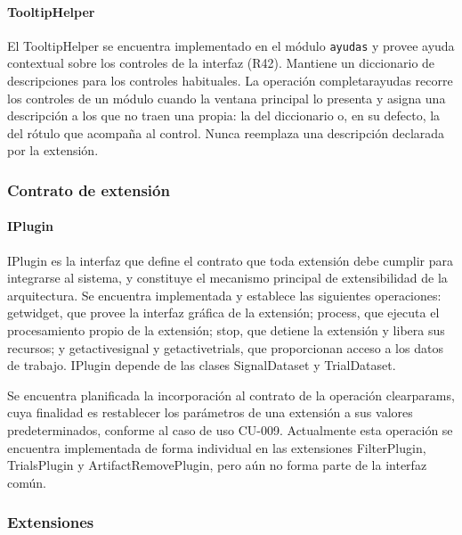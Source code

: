 \documentclass[11pt,a4paper]{article}
\DeclareRobustCommand{\_}{\textunderscore\allowbreak}
\begin{document}
\paragraph{TooltipHelper}
El TooltipHelper se encuentra implementado en el módulo \texttt{ayudas} y provee ayuda contextual sobre los controles de la interfaz (R42). Mantiene un diccionario de descripciones para los controles habituales. La operación completar\_ayudas recorre los controles de un módulo cuando la ventana principal lo presenta y asigna una descripción a los que no traen una propia: la del diccionario o, en su defecto, la del rótulo que acompaña al control. Nunca reemplaza una descripción declarada por la extensión.

\subsubsection{Contrato de extensión}

\paragraph{IPlugin}
IPlugin es la interfaz que define el contrato que toda extensión debe cumplir para integrarse al sistema, y constituye el mecanismo principal de extensibilidad de la arquitectura. Se encuentra implementada y establece las siguientes operaciones: get\_widget, que provee la interfaz gráfica de la extensión; process, que ejecuta el procesamiento propio de la extensión; stop, que detiene la extensión y libera sus recursos; y get\_active\_signal y get\_active\_trials, que proporcionan acceso a los datos de trabajo. IPlugin depende de las clases SignalDataset y TrialDataset.

Se encuentra planificada la incorporación al contrato de la operación clear\_params, cuya finalidad es restablecer los parámetros de una extensión a sus valores predeterminados, conforme al caso de uso CU-009. Actualmente esta operación se encuentra implementada de forma individual en las extensiones FilterPlugin, TrialsPlugin y ArtifactRemovePlugin, pero aún no forma parte de la interfaz común.

\subsubsection{Extensiones}
\end{document}
